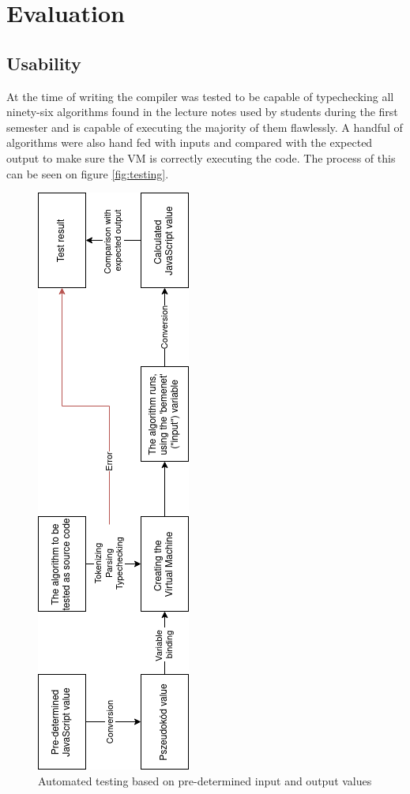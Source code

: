 \documentclass[conference]{IEEEtran}
\begin{document}
\section{Evaluation}

\subsection{Usability}

At the time of writing the compiler was tested to be capable of typechecking all ninety-six algorithms found in the lecture notes used by students during the first semester and is capable of executing the majority of them flawlessly. A handful of algorithms were also hand fed with inputs and compared with the expected output to make sure the VM is correctly executing the code. The process of this can be seen on figure \eqref{fig:testing}.

\begin{figure}[htbp]
\centerline{\includegraphics[height=0.6\textheight]{teszt_en2.png}}
\caption{Automated testing based on pre-determined input and output values}
\label{fig:testing}
\end{figure}
\end{document}
